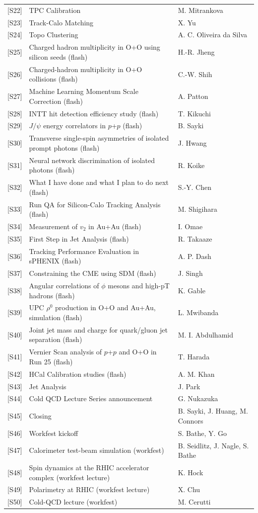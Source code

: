 \documentclass[11pt,letterpaper]{article}
\begin{document}
\begin{longtable}{@{}lp{9.3cm}p{4.2cm}@{}}
{[S22]} & TPC Calibration & M. Mitrankova\\
{[S23]} & Track-Calo Matching & X. Yu\\
{[S24]} & Topo Clustering & A. C. Oliveira da Silva\\
{[S25]} & Charged hadron multiplicity in O+O using silicon seeds (flash) & H.-R. Jheng\\
{[S26]} & Charged-hadron multiplicity in O+O collisions (flash) & C.-W. Shih\\
{[S27]} & Machine Learning Momentum Scale Correction (flash) & A. Patton\\
{[S28]} & INTT hit detection efficiency study (flash) & T. Kikuchi\\
{[S29]} & $J/\psi$ energy correlators in $p$+$p$ (flash) & B. Sayki\\
{[S30]} & Transverse single-spin asymmetries of isolated prompt photons (flash) & J. Hwang\\
{[S31]} & Neural network discrimination of isolated photons (flash) & R. Koike\\
{[S32]} & What I have done and what I plan to do next (flash) & S.-Y. Chen\\
{[S33]} & Run QA for Silicon-Calo Tracking Analysis (flash) & M. Shigihara\\
{[S34]} & Measurement of $v_2$ in Au+Au (flash) & I. Omae\\
{[S35]} & First Step in Jet Analysis (flash) & R. Takaaze\\
{[S36]} & Tracking Performance Evaluation in sPHENIX (flash) & A. P. Dash\\
{[S37]} & Constraining the CME using SDM (flash) & J. Singh\\
{[S38]} & Angular correlations of $\phi$ mesons and high-pT hadrons (flash) & K. Gable\\
{[S39]} & UPC $\rho^0$ production in O+O and Au+Au, simulation (flash) & L. Mwibanda\\
{[S40]} & Joint jet mass and charge for quark/gluon jet separation (flash) & M. I. Abdulhamid\\
{[S41]} & Vernier Scan analysis of $p$+$p$ and O+O in Run 25 (flash) & T. Harada\\
{[S42]} & HCal Calibration studies (flash) & A. M. Khan\\
{[S43]} & Jet Analysis & J. Park\\
{[S44]} & Cold QCD Lecture Series announcement & G. Nukazuka\\
{[S45]} & Closing & B. Sayki, J. Huang, M. Connors\\
{[S46]} & Workfest kickoff & S. Bathe, Y. Go\\
{[S47]} & Calorimeter test-beam simulation (workfest) & B. Seidlitz, J. Nagle, S. Bathe\\
{[S48]} & Spin dynamics at the RHIC accelerator complex (workfest lecture) & K. Hock\\
{[S49]} & Polarimetry at RHIC (workfest lecture) & X. Chu\\
{[S50]} & Cold-QCD lecture (workfest) & M. Cerutti\\
\bottomrule\end{longtable}
\end{document}
